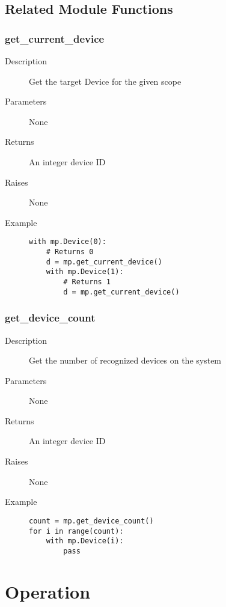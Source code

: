 \subsection{Related Module Functions}

\subsubsection{get\_current\_device}

\begin{description}
   \item[Description] Get the target Device for the given scope 
   \item[Parameters] None
   \item[Returns] An integer device ID
   \item[Raises] None
   \item[Example] \phantom{}
   \begin{lstlisting}
with mp.Device(0):
    # Returns 0
    d = mp.get_current_device()
    with mp.Device(1):
        # Returns 1
        d = mp.get_current_device()
\end{lstlisting}
\end{description}

\subsubsection{get\_device\_count}

\begin{description}
   \item[Description] Get the number of recognized devices on the system 
   \item[Parameters] None
   \item[Returns] An integer device ID
   \item[Raises] None
   \item[Example] \phantom{}
   \begin{lstlisting}
count = mp.get_device_count()
for i in range(count):
    with mp.Device(i):
        pass
\end{lstlisting}
\end{description}


\section{Operation}

